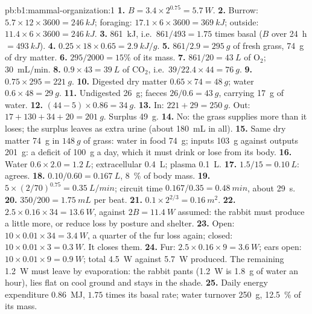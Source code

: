 \begin{solution}{pb:b1:mammal-organization:1}
\textbf{1.} $B = 3.4\times 2^{0.75} = \qty{5.7}{W}$.
\textbf{2.} Burrow: $5.7\times 12\times 3600 = \qty{246}{kJ}$;
foraging: $17.1\times 6\times 3600 = \qty{369}{kJ}$; outside:
$11.4\times 6\times 3600 = \qty{246}{kJ}$.
\textbf{3.} \qty{861}{kJ}, i.e.\ $861/493 = 1.75$ times basal
($B$ over \qty{24}{h} $= \qty{493}{kJ}$).
\textbf{4.} $0.25\times 18\times 0.65 = \qty{2.9}{kJ/g}$.
\textbf{5.} $861/2.9 = \qty{295}{g}$ of fresh grass, \qty{74}{g} of
dry matter.
\textbf{6.} $295/2000 = 15\%$ of its mass.
\textbf{7.} $861/20 = \qty{43}{L}$ of $\mathrm{O_2}$; \qty{30}{mL/min}.
\textbf{8.} $0.9\times 43 = \qty{39}{L}$ of $\mathrm{CO_2}$, i.e.\ $39/22.4\times 44 = \qty{76}{g}$.
\textbf{9.} $0.75\times 295 = \qty{221}{g}$.
\textbf{10.} Digested dry matter $0.65\times 74 = \qty{48}{g}$; water
$0.6\times 48 = \qty{29}{g}$.
\textbf{11.} Undigested \qty{26}{g}; faeces $26/0.6 = \qty{43}{g}$,
carrying \qty{17}{g} of water.
\textbf{12.} $(44 - 5)\times 0.86 = \qty{34}{g}$.
\textbf{13.} In: $221 + 29 = \qty{250}{g}$. Out: $17 + 130 + 34 + 20
= \qty{201}{g}$. Surplus \qty{49}{g}.
\textbf{14.} No: the grass supplies more than it loses; the surplus
leaves as extra urine (about \qty{180}{mL} in all).
\textbf{15.} Same dry matter \qty{74}{g} in $\qty{148}{g}$ of grass:
water in food \qty{74}{g}; inputs \qty{103}{g} against outputs
\qty{201}{g}: a deficit of \qty{100}{g} a day, which it must drink or
lose from its body.
\textbf{16.} Water $0.6\times 2.0 = \qty{1.2}{L}$; extracellular
\qty{0.4}{L}; plasma \qty{0.1}{L}.
\textbf{17.} $1.5/15 = \qty{0.10}{L}$: agrees.
\textbf{18.} $0.10/0.60 = \qty{0.167}{L}$, \qty{8}{\%} of body mass.
\textbf{19.} $5\times(2/70)^{0.75} = \qty{0.35}{L/min}$; circuit time
$0.167/0.35 = \qty{0.48}{min}$, about \qty{29}{s}.
\textbf{20.} $350/200 = \qty{1.75}{mL}$ per beat.
\textbf{21.} $0.1\times 2^{2/3} = \qty{0.16}{m^2}$.
\textbf{22.} $2.5\times 0.16\times 34 = \qty{13.6}{W}$, against
$2B = \qty{11.4}{W}$ assumed: the rabbit must produce a little more, or
reduce loss by posture and shelter.
\textbf{23.} Open: $10\times 0.01\times 34 = \qty{3.4}{W}$, a quarter
of the fur loss again; closed: $10\times 0.01\times 3 =
\qty{0.3}{W}$. It closes them.
\textbf{24.} Fur: $2.5\times 0.16\times 9 = \qty{3.6}{W}$; ears open:
$10\times 0.01\times 9 = \qty{0.9}{W}$; total \qty{4.5}{W} against
\qty{5.7}{W} produced. The remaining \qty{1.2}{W} must leave by
evaporation: the rabbit pants (\qty{1.2}{W} is \qty{1.8}{g} of water
an hour), lies flat on cool ground and stays in the shade.
\textbf{25.} Daily energy expenditure \qty{0.86}{MJ}, $1.75$ times its
basal rate; water turnover \qty{250}{g}, \qty{12.5}{\%} of its mass.
\end{solution}
